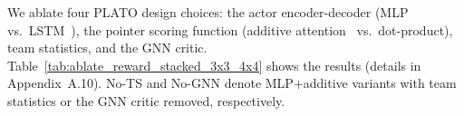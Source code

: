 
We ablate four PLATO design choices: the actor encoder-decoder (MLP~\cite{rumelhart1986learning_mlp} vs.\ LSTM~\cite{lstm}), the pointer scoring function (additive attention~\cite{bahdanau2014neural} vs.\ dot-product), team statistics, and the GNN critic. Table~\ref{tab:ablate_reward_stacked_3x3_4x4} shows the results (details in Appendix~A.10). No-TS and No-GNN denote MLP+additive variants with team statistics or the GNN critic removed, respectively.







